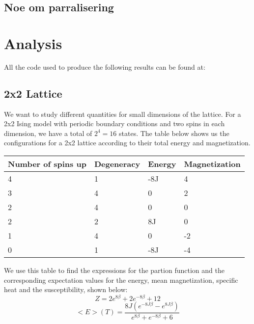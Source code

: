 \documentclass{article}
\begin{document}
\subsection*{Noe om parralisering}
\section*{Analysis}
All the code used to produce the following results can be found at:
\subsection*{2x2 Lattice}
We want to study different quantities for small dimensions of the lattice. For a 2x2 Ising model with periodic boundary conditions and two spins in each dimension, we have a total of $2^4 = 16$ states. The table below shows us the  configurations for a 2x2 lattice according to their total energy and magnetization.\newline \newline
\begin{wrapfigure}
\begin{wraptable}
\centering
\label{my-label}
\begin{tabular}{|l|l|l|l|}
\hline
Number of spins up & Degeneracy & Energy & Magnetization \\ \hline
4                  & 1          & -8J    & 4             \\ \hline
3                  & 4          & 0      & 2             \\ \hline
2                  & 4          & 0      & 0             \\ \hline
2                  & 2          & 8J     & 0             \\ \hline
1                  & 4          & 0      & -2            \\ \hline
0                  & 1          & -8J    & -4            \\ \hline
\end{tabular}
\caption{List of configurations according to their total energy and magnetization}
\end{wraptable}
\end{wrapfigure}
\newline \newline We use this table to find the expressions for the partion function and the corresponding expectation values for the energy, mean magnetization, specific heat and the susceptibility, shown below: 
$$Z = 2e^{8\beta} + 2e^{-8\beta} +12 $$
$$<E>(T) = \frac{8J(e^{-8J\beta}-e^{8J\beta})}{e^{8\beta} + e^{-8\beta} +6}$$
\end{document}

